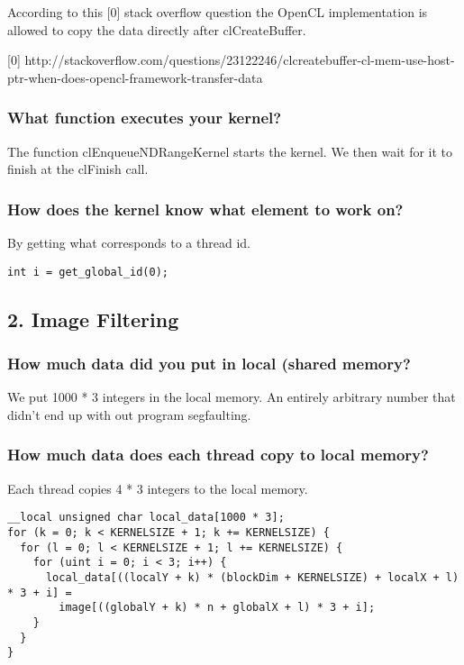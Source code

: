 \documentclass[a4paper,12pt]{article}
\begin{document}
According to this [0] stack overflow question the OpenCL implementation is allowed to copy the data directly after clCreateBuffer.

[0] http://stackoverflow.com/questions/23122246/clcreatebuffer-cl-mem-use-host-ptr-when-does-opencl-framework-transfer-data


\subsubsection{What function executes your kernel?}

The function clEnqueueNDRangeKernel starts the kernel. We then wait for it to finish at the clFinish call.


\subsubsection{How does the kernel know what element to work on?}

By getting what corresponds to a thread id.

\begin{lstlisting}[caption= Getting the global id in the 1st direction.]
  int i = get_global_id(0);
\end{lstlisting}
\noindent



\subsection{2. Image Filtering}

\subsubsection{How much data did you put in local (shared memory?}

We put 1000 * 3 integers in the local memory. An entirely arbitrary number that didn't end up with out program segfaulting.


\subsubsection{How much data does each thread copy to local memory?}

Each thread copies 4 * 3 integers to the local memory.

\begin{lstlisting}[float,label=lst:caching,caption= Caching data in local/shared memory.]
__local unsigned char local_data[1000 * 3];
for (k = 0; k < KERNELSIZE + 1; k += KERNELSIZE) {
  for (l = 0; l < KERNELSIZE + 1; l += KERNELSIZE) {
    for (uint i = 0; i < 3; i++) {
      local_data[((localY + k) * (blockDim + KERNELSIZE) + localX + l) * 3 + i] =
        image[((globalY + k) * n + globalX + l) * 3 + i];
    }
  }
}
\end{lstlisting}
\noindent
\end{document}
